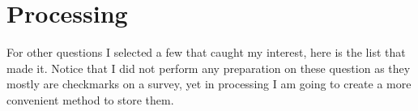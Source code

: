 \documentclass[letterpaper,10pt,english]{jupyterBook}
\begin{document}
\section{Processing}
\label{\detokenize{c7_case_studies/UserSurvey:processing}}
\sphinxAtStartPar
For other questions I selected a few that caught my interest, here is the list that made it. Notice that I did not perform any preparation on these question as they mostly are checkmarks on a survey, yet in processing I am going to create a more convenient method to store them.

\begin{sphinxVerbatim}[commandchars=\\\{\}]
\end{sphinxVerbatim}
\end{document}
